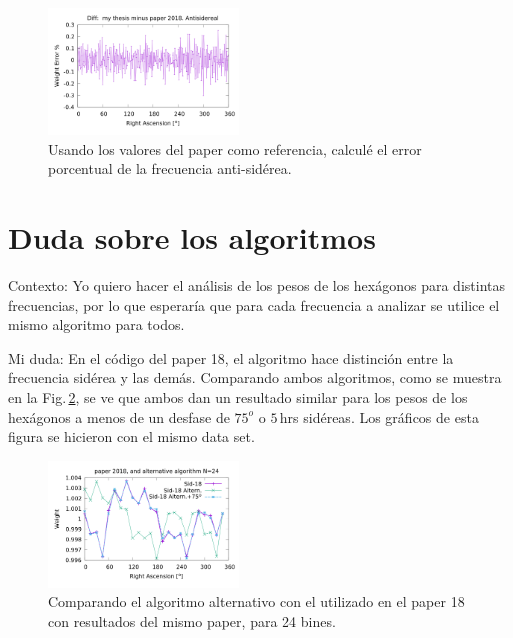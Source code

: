 \begin{figure}[H]
	\centering
	\includegraphics[width=0.45\textwidth]{Graficos/anti_my_and_paper_in_360_error.png}
	\caption{Usando los valores del paper como referencia, calculé el error porcentual de la frecuencia anti-sidérea.}
	\label{fig:error_360_anti}
\end{figure}



\section{Duda sobre los algoritmos}

Contexto: Yo quiero hacer el análisis de los pesos de los hexágonos para distintas frecuencias, por lo que esperaría que para cada frecuencia a analizar se utilice el mismo algoritmo para todos.

Mi duda: En el código del paper 18, el algoritmo hace distinción entre la frecuencia sidérea y las demás. Comparando ambos algoritmos, como se muestra en la Fig.\,\ref{fig:alter_24}, se ve que ambos dan un resultado similar para los pesos de los hexágonos a menos de un desfase de $75^o$ o $5\,$hrs sidéreas. Los gráficos de esta figura se hicieron con el mismo data set.

\begin{figure}[H]
	\centering
	\includegraphics[width=0.45\textwidth]{Graficos/sidereal_paper_in_24_w_alter.png}
	\caption{Comparando el algoritmo alternativo con el utilizado en el paper 18 con resultados del mismo paper, para 24 bines.}
	\label{fig:alter_24}
\end{figure}


